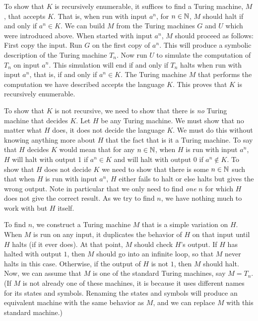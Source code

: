 To show that $K$ is recursively enumerable, it suffices to find
a Turing machine, $M$, that accepts $K$.  That is, when run
with input $a^n$, for $n\in{\mathbb N}$, $M$ should halt if and only if
$a^n\in K$.  We can build $M$ from the Turing machines $G$ and $U$
which were introduced above.  When started with input $a^n$, 
$M$ should proceed as follows:  
First copy the input.  Run $G$ on the
first copy of $a^n$.  This will produce a symbolic description
of the Turing machine $T_n$.  Now run $U$ to simulate the 
computation of $T_n$ on input $a^n$.  This simulation will end
if and only if $T_n$ halts when run with input $a^n$, that is, if and only
if $a^n\in K$.  The Turing machine $M$ that performs the computation
we have described accepts the language $K$.
This proves that $K$ is recursively enumerable.

To show that $K$ is not recursive, we need to show that
there is \textit{no} Turing machine that decides $K$.  
Let $H$ be any Turing machine.  We must show that
no matter what $H$ does, it
does not decide the language $K$.  We must do this without
knowing anything more about $H$ that the fact that is it
a Turing machine.  To say that $H$ decides
$K$ would mean that for any $n\in{\mathbb N}$, when $H$ is
run with input $a^n$, $H$ will halt with output 1 if $a^n\in K$
and will halt with output 0 if $a^n\not\in K$.  To show that
$H$ does not decide $K$ we need to show that there is some
$n\in{\mathbb N}$ such that when $H$ is run with input $a^n$, 
$H$ either fails to halt or else halts but gives the wrong 
output.  Note in particular that we only need to find \textit{one}
$n$ for which $H$ does not give the correct result.
As we try to find $n$, we have nothing much to work with
but $H$ itself.

To find $n$, we construct a Turing machine $M$ that is a simple
variation on $H$.  When $M$ is run on any input, it duplicates the behavior
of $H$ on that input until $H$ halts (if it ever does).  At that point, $M$ should
check $H$'s output.  If $H$ has halted with output $1$, then 
$M$ should go into an infinite loop, so that $M$ never halts in this case.
Otherwise, if the output of $H$ is not $1$, then $M$ should halt.
Now, we can assume that $M$ is one
of the standard Turing machines, say $M=T_n$.  (If $M$ is not
already one of these machines, it is because it uses different names
for its states and symbols.  Renaming the states and symbols will
produce an equivalent machine with the same behavior as $M$,
and we can replace $M$ with this standard machine.)  

